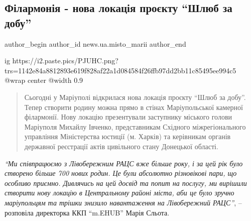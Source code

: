  
 
 
 
 
 
\subsection{Філармонія - нова локація проєкту \enquote{Шлюб за добу}}
\label{sec:30_09_2021.stz.news.ua.misto_marii.1.filarmonia_nova_lokacia_shlub_za_dobu}
 
\ifcmt
 author_begin
   author_id news.ua.misto_marii
 author_end
\fi

\ifcmt
  ig https://i2.paste.pics/PJUHC.png?trs=1142e84a8812893e619f828af22a1d084584f26ffb97dd2bb11c85495ee994c5
  @wrap center
  @width 0.9
\fi

\begin{quote}
Сьогодні у Маріуполі відкрилася нова локація проєкту \enquote{Шлюб за добу}. Тепер
створити родину можна прямо в стінах Маріупольської камерної філармонії. Нову
локацію презентували заступнику міського голови Маріуполя Михайлу Івченко,
представникам Східного міжрегіонального управління Міністерства юстиції (м.
Харків) та керівникам органів державної реєстрації актів цивільного стану
Донецької області.	
\end{quote}


\emph{\enquote{Ми співпрацюємо з Лівобережним РАЦС вже більше року, і за цей рік було
створено більше 700 нових родин. Це були абсолютно різновікові пари, що
особливо приємно. Дивлячись на цей досвід та попит на послугу, ми вирішили
створити нову локацію в Центральному районі міста, аби це було зручно
маріупольцям та трішки знизило навантаження на Лівобережний РАЦС}}, – розповіла
директорка ККП \enquote{m.EHUB} Марія Сльота.

